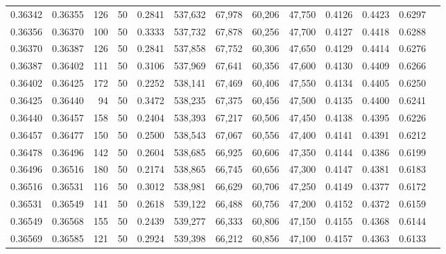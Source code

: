 \begin{tabular}{rrrrrrrrrrrrr}
0.36342 & 0.36355 &   126 &  50 &                                     0.2841 & 537,632 &  67,978 &  60,206 &  47,750 & 0.4126 & 0.4423 & 0.6297 \\
0.36356 & 0.36370 &   100 &  50 &                                     0.3333 & 537,732 &  67,878 &  60,256 &  47,700 & 0.4127 & 0.4418 & 0.6288 \\
0.36370 & 0.36387 &   126 &  50 &                                     0.2841 & 537,858 &  67,752 &  60,306 &  47,650 & 0.4129 & 0.4414 & 0.6276 \\
0.36387 & 0.36402 &   111 &  50 &                                     0.3106 & 537,969 &  67,641 &  60,356 &  47,600 & 0.4130 & 0.4409 & 0.6266 \\
0.36402 & 0.36425 &   172 &  50 &                                     0.2252 & 538,141 &  67,469 &  60,406 &  47,550 & 0.4134 & 0.4405 & 0.6250 \\
0.36425 & 0.36440 &    94 &  50 &                                     0.3472 & 538,235 &  67,375 &  60,456 &  47,500 & 0.4135 & 0.4400 & 0.6241 \\
0.36440 & 0.36457 &   158 &  50 &                                     0.2404 & 538,393 &  67,217 &  60,506 &  47,450 & 0.4138 & 0.4395 & 0.6226 \\
0.36457 & 0.36477 &   150 &  50 &                                     0.2500 & 538,543 &  67,067 &  60,556 &  47,400 & 0.4141 & 0.4391 & 0.6212 \\
0.36478 & 0.36496 &   142 &  50 &                                     0.2604 & 538,685 &  66,925 &  60,606 &  47,350 & 0.4144 & 0.4386 & 0.6199 \\
0.36496 & 0.36516 &   180 &  50 &                                     0.2174 & 538,865 &  66,745 &  60,656 &  47,300 & 0.4147 & 0.4381 & 0.6183 \\
0.36516 & 0.36531 &   116 &  50 &                                     0.3012 & 538,981 &  66,629 &  60,706 &  47,250 & 0.4149 & 0.4377 & 0.6172 \\
0.36531 & 0.36549 &   141 &  50 &                                     0.2618 & 539,122 &  66,488 &  60,756 &  47,200 & 0.4152 & 0.4372 & 0.6159 \\
0.36549 & 0.36568 &   155 &  50 &                                     0.2439 & 539,277 &  66,333 &  60,806 &  47,150 & 0.4155 & 0.4368 & 0.6144 \\
0.36569 & 0.36585 &   121 &  50 &                                     0.2924 & 539,398 &  66,212 &  60,856 &  47,100 & 0.4157 & 0.4363 & 0.6133 \\

\end{tabular}
